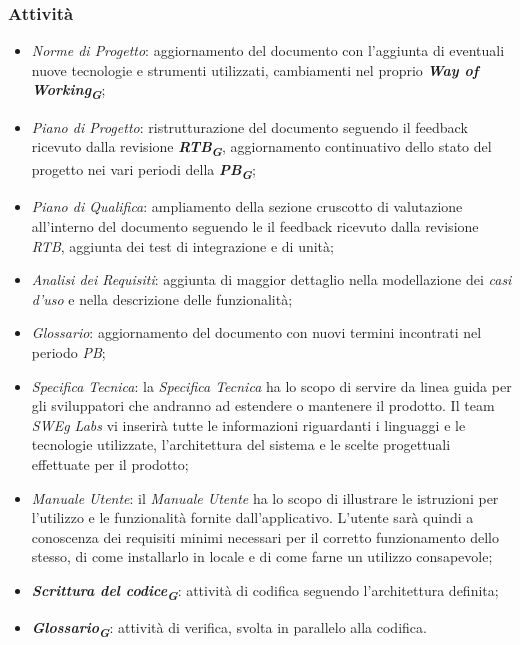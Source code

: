 \subsubsection{Attività}

\begin{itemize}
\item \emph{Norme di Progetto}: aggiornamento del documento con l’aggiunta di eventuali nuove tecnologie e strumenti utilizzati, cambiamenti nel proprio \textbf{\emph{Way of Working}}\textsubscript{\textit{\textbf{G}}};
\item \emph{Piano di Progetto}: ristrutturazione del documento seguendo il feedback ricevuto dalla revisione \textbf{\emph{RTB}}\textsubscript{\textit{\textbf{G}}}, aggiornamento continuativo dello stato del progetto nei vari periodi della \textbf{\emph{PB}}\textsubscript{\textit{\textbf{G}}};
\item \emph{Piano di Qualifica}: ampliamento della sezione cruscotto di valutazione all’interno del documento seguendo le il feedback ricevuto dalla revisione \emph{RTB}, aggiunta dei test di integrazione e di unità;
\item \emph{Analisi dei Requisiti}: aggiunta di maggior dettaglio nella modellazione dei \emph{casi d’uso} e nella descrizione delle funzionalità;
\item \emph{Glossario}: aggiornamento del documento con nuovi termini incontrati nel periodo \emph{PB};
\item \emph{Specifica Tecnica}: la \emph{Specifica Tecnica} ha lo scopo di servire da linea guida per gli sviluppatori che andranno ad estendere o mantenere il prodotto. Il team \emph{SWEg Labs} vi inserirà tutte le informazioni riguardanti i linguaggi e le tecnologie utilizzate, l’architettura del sistema e le scelte progettuali effettuate per il prodotto;
\item \emph{Manuale Utente}: il \emph{Manuale Utente} ha lo scopo di illustrare le istruzioni per l’utilizzo e le funzionalità fornite dall’applicativo. L’utente sarà quindi a conoscenza dei requisiti minimi necessari per il corretto funzionamento dello stesso, di come installarlo in locale e di come farne un utilizzo consapevole;
\item \textbf{\emph{Scrittura del codice}}\textsubscript{\textit{\textbf{G}}}: attività di codifica seguendo l’architettura definita;
\item \textbf{\emph{Glossario}}\textsubscript{\textit{\textbf{G}}}: attività di verifica, svolta in parallelo alla codifica.
\end{itemize}